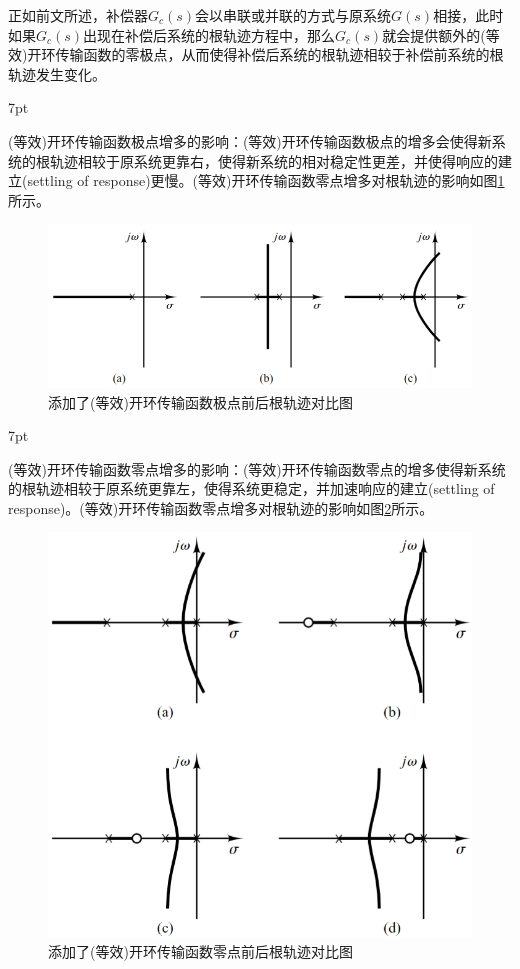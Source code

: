 \documentclass{article}
\numberwithin{equation}{section}
\numberwithin{figure}{section}
\newenvironment{formal}{%
\def\FrameCommand{%
\hspace{1pt}%
{\color{DarkBlue}\vrule width 2pt}%
{\color{formalshade}\vrule width 4pt}%
\colorbox{formalshade}%
}%
\MakeFramed{\advance\hsize-\width\FrameRestore}%
\noindent\hspace{-4.55pt}%
\begin{adjustwidth}{}{7pt}%
\vspace{2pt}\vspace{2pt}%
}
{%
\vspace{2pt}\end{adjustwidth}\endMakeFramed%
}
\begin{document}
正如前文所述，补偿器$G_c(s)$会以串联或并联的方式与原系统$G(s)$相接，此时如果$G_c(s)$出现在补偿后系统的根轨迹方程中，那么$G_c(s)$就会提供额外的(等效)开环传输函数的零极点，从而使得补偿后系统的根轨迹相较于补偿前系统的根轨迹发生变化。

\begin{formal}
    (等效)开环传输函数极点增多的影响：(等效)开环传输函数极点的增多会使得新系统的根轨迹相较于原系统更靠右，使得新系统的相对稳定性更差，并使得响应的建立(settling of response)更慢。(等效)开环传输函数零点增多对根轨迹的影响如图\ref{effectofadditionalopenlooppolesonrootlocus}所示。
\end{formal}

\begin{figure}
    \centering
    \includegraphics[width=.5\textwidth]{Chapter6/effectofadditionalopenlooppolesonrootlocus.png} %
    \caption{添加了(等效)开环传输函数极点前后根轨迹对比图} %
    \label{effectofadditionalopenlooppolesonrootlocus} %
\end{figure}

\begin{formal}
    (等效)开环传输函数零点增多的影响：(等效)开环传输函数零点的增多使得新系统的根轨迹相较于原系统更靠左，使得系统更稳定，并加速响应的建立(settling of response)。(等效)开环传输函数零点增多对根轨迹的影响如图\ref{effectofadditionalopenloopzerosonrootlocus}所示。
\end{formal}

\begin{figure}
    \centering
    \includegraphics[width=.4\textwidth]{Chapter6/effectofadditionalopenloopzerosonrootlocus.png} %
    \caption{添加了(等效)开环传输函数零点前后根轨迹对比图} %
    \label{effectofadditionalopenloopzerosonrootlocus} %
\end{figure}
\end{document}
